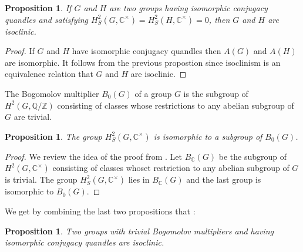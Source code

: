 \documentclass[12pt, reqno]{amsart}
\newtheorem{proposition}[theorem]{Proposition}
\begin{document}
\begin{proposition}
If $G$ and $H$ are two groups having isomorphic conjugacy quandles and satisfying $H^2_S(G,\mathbb{C}^\times)=H^2_S(H,\mathbb{C}^\times)=0$, then $G$ and $H$ are isoclinic.
\end{proposition}
\begin{proof}
If $G$ and $H$ have isomorphic conjugacy quandles then $A(G)$ and $A(H)$ are isomorphic. It follows from the previous propostion since isoclinism is an equivalence relation that $G$ and $H$ are isoclinic.
\end{proof}
The Bogomolov multiplier $B_0(G)$ of a group $G$ is the subgroup of $H^2(G,\mathbb{Q}/\mathbb{Z})$ consisting of classes whose restrictions to any abelian subgroup of $G$ are trivial. 
\begin{proposition}\cite{MM}
The group $H_S^2(G,\mathbb{C}^\times)$ is isomorphic to a subgroup of $B_0(G)$.
\end{proposition}
\begin{proof}
We review the idea of the proof from \cite{MM}. Let $B_\mathbb{C}(G)$ be the subgroup of $H^2(G,\mathbb{C}^\times)$ consisting of classes whoset restriction to any abelian subgroup of $G$ is trivial. The group $H^2_S(G,\mathbb{C}^\times)$ lies in $B_\mathbb{C}(G)$ and the last group is isomorphic to $B_0(G)$.
\end{proof}
We get by combining the last two propositions that :
\begin{proposition}\label{prop}
Two groups with trivial Bogomolov multipliers and having isomorphic conjugacy quandles are isoclinic. 
\end{proposition}
\end{document}
